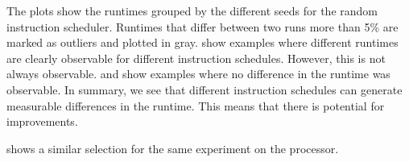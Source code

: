 The plots show the runtimes grouped by the different seeds for the random instruction scheduler.
Runtimes that differ between two runs more than 5\% are marked as outliers and plotted in gray.
 show examples where different runtimes are clearly observable for different instruction schedules.
However, this is not always observable.
 and  show examples where no difference in the runtime was observable.
In summary, we see that different instruction schedules can generate measurable differences in the runtime.
This means that there is potential for improvements.

 shows a similar selection for the same experiment on the \aurora{} processor.

